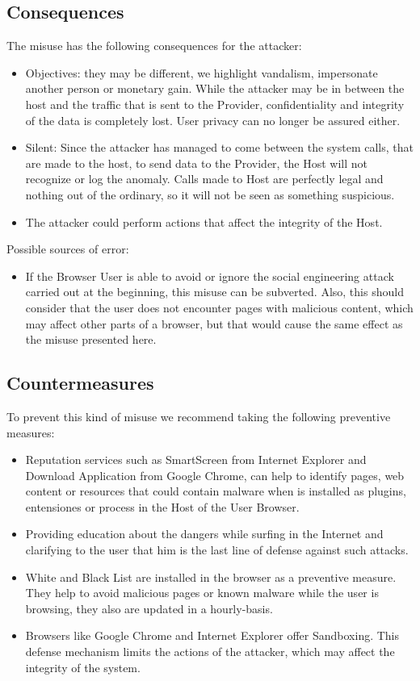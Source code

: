 \documentclass{sig-alternate-05-2015}
\begin{document}
\subsection*{Consequences}
  The misuse has the following consequences for the attacker:
  \begin{itemize}
    \item Objectives: they may be different, we highlight vandalism, impersonate another person or monetary gain. While the attacker may be in between the host and the traffic that is sent to the Provider, confidentiality and integrity of the data is completely lost. User privacy can no longer be assured either.
    \item Silent: Since the attacker has managed to come between the system calls, that are made to the host, to send data to the Provider, the Host will not recognize or log the anomaly. Calls made to Host are perfectly legal and nothing out of the ordinary, so it will not be seen as something suspicious.
    \item The attacker could perform actions that affect the integrity of the Host.
  \end{itemize}
  Possible sources of error:
  \begin{itemize}
    \item If the Browser User is able to avoid or ignore the social engineering attack carried out at the beginning, this misuse can be subverted. Also, this should consider that the user does not encounter pages with malicious content, which may affect other parts of a browser, but that would cause the same effect as the misuse presented here.
  \end{itemize}

\subsection*{Countermeasures} 
  To prevent this kind of misuse we recommend taking the following preventive measures:
  \begin{itemize}
    \item Reputation services such as SmartScreen \cite{Colvin2010} from Internet Explorer and Download Application \cite{Rajab2013} from Google Chrome, can help to identify pages, web content or resources that could contain malware when is installed as plugins, entensiones or process in the Host of the User Browser.
    \item Providing education about the dangers while surfing in the Internet and clarifying to the user that him is the last line of defense against such attacks.
    \item White and Black List are installed in the browser as a preventive measure. They help to avoid malicious pages or known malware while the user is browsing, they also are updated in a hourly-basis.
    \item Browsers like Google Chrome and Internet Explorer offer Sandboxing. This defense mechanism limits the actions of the attacker, which may affect the integrity of the system.
  \end{itemize}
\end{document}
